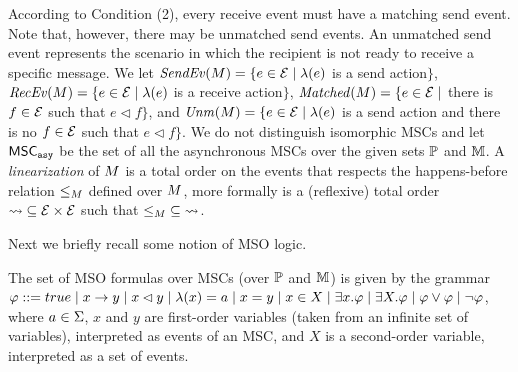 According to Condition (2), every receive event must have a matching send event. Note that, however, there may be unmatched send events. An unmatched send event represents the scenario in which the recipient is not ready to receive a specific message.
We let
$\mathit{SendEv}(M) = \{e \in \mathcal{E} \mid \lambda(e)$ is a send
action$\}$,
$\mathit{RecEv}(M) = \{e \in \mathcal{E} \mid \lambda(e)$ is a receive
action$\}$,
$\mathit{Matched}(M) = \{e \in \mathcal{E} \mid$ there is $f \in \mathcal{E}$
such that $e \lhd f\}$, and
$\mathit{Unm}(M) = \{e \in \mathcal{E} \mid \lambda(e)$ is a send
action and there is no $f \in \mathcal{E}$ such that $e \lhd f\}$.
%
We do not distinguish isomorphic MSCs and
let $\mathsf{MSC}_{\mathtt{asy}}$ be the set of all the asynchronous MSCs over the given sets $\mathbb{P}$ and $\mathbb{M}$. 
%
%
%
A \emph{linearization} of $M$ is a total order on the events that respects the happens-before relation $\le_M$ defined over $M$, more formally is a (reflexive) total order ${\rightsquigarrow} \subseteq \mathcal{E} \times \mathcal{E}$ such that ${\le_M} \subseteq {\rightsquigarrow}$. 

Next we briefly recall some notion of MSO logic.

\begin{definition}
The set of MSO formulas over MSCs (over $\mathbb{P}$ and $\mathbb{M}$) is given by the grammar
$
\varphi ::= true \mid x \to y \mid x \lhd y \mid \lambda(x) = a \mid x = y \mid x \in X \mid \exists x.\varphi \mid \exists X.\varphi \mid \varphi \vee \varphi \mid \neg \varphi
$,
where $a \in \Sigma$, $x$ and $y$ are first-order variables (taken from an infinite set of variables), interpreted as
events of an MSC, and $X$ is a second-order variable, interpreted
as a set of events. 
\end{definition}

